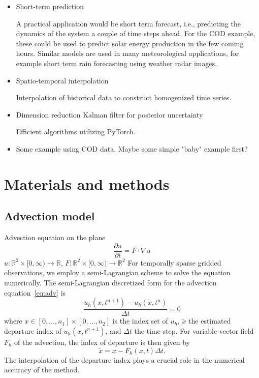 \documentclass[a4paper,12pt]{article}
\begin{document}
\begin{itemize}
    \item
        Short-term prediction

        A practical application would be short term forecast, i.e., predicting the dynamics of the system a couple of time steps ahead. For the COD example, these could be used to predict solar energy production in the few coming hours. Similar models are used in many meteorological applications, for example short term rain forecasting using weather radar images.

    \item
        Spatio-temporal interpolation

        Interpolation of historical data to construct homogenized time series.

    \item
        Dimension reduction Kalman filter for posterior uncertainty

        Efficient algorithms utilizing PyTorch.

    \item Some example using COD data. Maybe some simple "baby" example first?

\end{itemize}







\section{Materials and methods}
\subsection{Advection model}
Advection equation on the plane
\begin{equation}\label{eq:adv}
    \frac{\partial u}{\partial t} = F \cdot \nabla u
\end{equation}
$u: \mathbb{R}^2 \times [0, \infty)  \rightarrow \mathbb{R}$, $F: \mathbb{R}^2 \times [0, \infty) \rightarrow \mathbb{R}^2$
For temporally sparse gridded observations, we employ a semi-Lagrangian scheme to solve the equation numerically.
The semi-Lagrangian discretized form for the advection equation~\eqref{eq:adv} is
\begin{equation}
    \frac{u_h(x, t^{n+1}) - u_h(\tilde{x}, t^n)}{\Delta t} = 0
\end{equation}
where $x \in [0, \dots, n_1] \times [0, \dots, n_2]$ is the index set of $u_h$, $\tilde{x}$ the estimated departure index of $u_h(x, t^{n+1})$, and $\Delta t$ the time step.
For variable vector field $F_h$ of the advection, the index of departure is then given by
\begin{equation}
    \tilde{x} = x - F_h(x, t) \Delta t.
\end{equation}
The interpolation of the departure index plays a crucial role in the numerical accuracy of the method.
\end{document}
